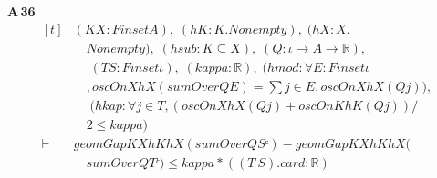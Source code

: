 \noindent\textbf{A\,36}\quad{}
{\footnotesize\[ \begin{aligned}[t]
&(\mathit{K} \mathit{X} : \mathit{Finset} \mathit{A}),\; (\mathit{hK} : \mathit{K}.\mathit{Nonempty}),\; (\mathit{hX} : \mathit{X}.\\
&\quad \mathit{Nonempty}),\; (\mathit{hsub} : \mathit{K} \subseteq \mathit{X}),\; (\mathit{Q} : \iota \to \mathit{A} \to \mathbb{R} ),\\
&\quad \; (\mathit{T} \mathit{S} : \mathit{Finset} \iota ),\; (\mathit{kappa} : \mathbb{R} ),\; (\mathit{hmod} : \forall \mathit{E} : \mathit{Finset} \iota\\
&\quad , \mathit{oscOn} \mathit{X} \mathit{hX} (\mathit{sumOver} \mathit{Q} \mathit{E}) = \textstyle\sum \mathit{j} \in \mathit{E}, \mathit{oscOn} \mathit{X} \mathit{hX} (\mathit{Q} \mathit{j})),\\
&\quad \; (\mathit{hkap} : \forall \mathit{j} \in \mathit{T}, (\mathit{oscOn} \mathit{X} \mathit{hX} (\mathit{Q} \mathit{j}) + \mathit{oscOn} \mathit{K} \mathit{hK} (\mathit{Q} \mathit{j})) /\\
&\quad 2 \leq \mathit{kappa})\\
\vdash\;&\mathit{geomGap} \mathit{K} \mathit{X} \mathit{hK} \mathit{hX} (\mathit{sumOver} \mathit{Q} \mathit{Sᶜ}) - \mathit{geomGap} \mathit{K} \mathit{X} \mathit{hK} \mathit{hX} (\\
&\quad \mathit{sumOver} \mathit{Q} \mathit{Tᶜ}) \leq \mathit{kappa} * ((\mathit{T} \ \mathit{S}).\mathit{card} : \mathbb{R} )
\end{aligned} \]}

